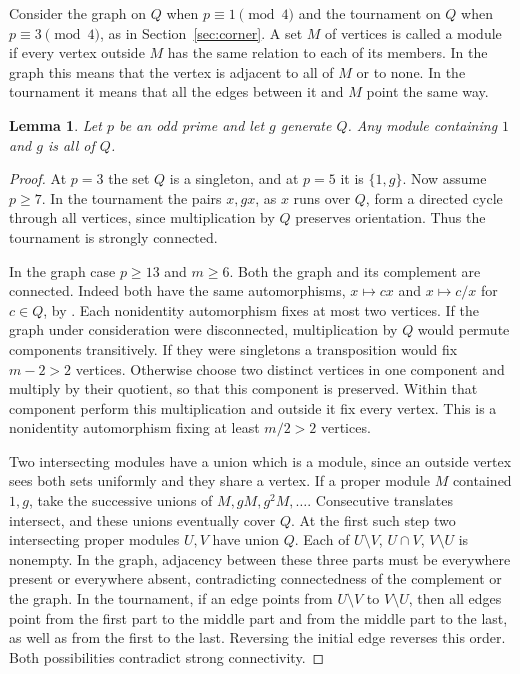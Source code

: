 \documentclass[11pt,a4paper]{article}
\newtheorem{lemma}[theorem]{Lemma}
\numberwithin{equation}{section}
\begin{document}
Consider the graph on $Q$ when $p\equiv1\pmod4$ and the tournament on $Q$ when $p\equiv3\pmod4$, as in Section~\ref{sec:corner}. A set $M$ of vertices is called a module if every vertex outside $M$ has the same relation to each of its members. In the graph this means that the vertex is adjacent to all of $M$ or to none. In the tournament it means that all the edges between it and $M$ point the same way.

\begin{lemma}\label{prime:generator-module}
Let $p$ be an odd prime and let $g$ generate $Q$. Any module containing $1$ and $g$ is all of $Q$.
\end{lemma}
\begin{proof}
At $p=3$ the set $Q$ is a singleton, and at $p=5$ it is $\{1,g\}$. Now assume $p\ge7$. In the tournament the pairs $x,gx$, as $x$ runs over $Q$, form a directed cycle through all vertices, since multiplication by $Q$ preserves orientation. Thus the tournament is strongly connected.

In the graph case $p\ge13$ and $m\ge6$. Both the graph and its complement are connected. Indeed both have the same automorphisms, $x\mapsto cx$ and $x\mapsto c/x$ for $c\in Q$, by \cite{mk}. Each nonidentity automorphism fixes at most two vertices. If the graph under consideration were disconnected, multiplication by $Q$ would permute components transitively. If they were singletons a transposition would fix $m-2>2$ vertices. Otherwise choose two distinct vertices in one component and multiply by their quotient, so that this component is preserved. Within that component perform this multiplication and outside it fix every vertex. This is a nonidentity automorphism fixing at least $m/2>2$ vertices.

Two intersecting modules have a union which is a module, since an outside vertex sees both sets uniformly and they share a vertex. If a proper module $M$ contained $1,g$, take the successive unions of $M,gM,g^2M,\ldots$. Consecutive translates intersect, and these unions eventually cover $Q$. At the first such step two intersecting proper modules $U,V$ have union $Q$. Each of $U\setminus V$, $U\cap V$, $V\setminus U$ is nonempty. In the graph, adjacency between these three parts must be everywhere present or everywhere absent, contradicting connectedness of the complement or the graph. In the tournament, if an edge points from $U\setminus V$ to $V\setminus U$, then all edges point from the first part to the middle part and from the middle part to the last, as well as from the first to the last. Reversing the initial edge reverses this order. Both possibilities contradict strong connectivity.
\end{proof}
\end{document}
